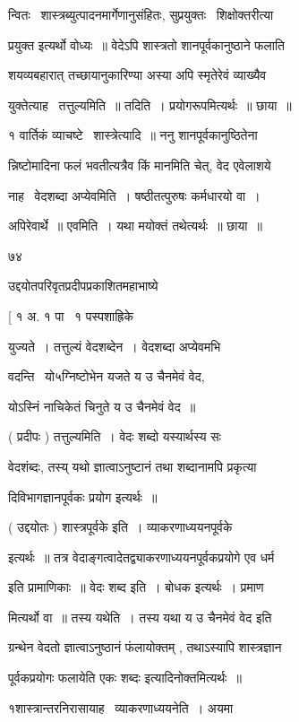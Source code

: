\documentclass[11pt, openany]{book}
\begin{document}
न्वितः \textendash\ शास्त्रब्युत्पादनमार्गेणानुसंहितः, सुप्रयुक्तः \textendash\ शिक्षोक्तरीत्या 

प्रयुक्त इत्यर्थो वोध्यः~॥ वेदेऽपि शास्त्रतो शानपूर्वकानुष्ठाने फलाति \textendash\ 


शयव्यबहारात् तच्छायानुकारिण्या अस्या अपि स्मृतेरेवं व्याख्यैव 

युक्तेत्याह \textendash\ तत्तुल्यमिति~॥ तदिति~। प्रयोगरूपमित्यर्थः~॥ छाया~॥ 

१ वार्तिकं व्याचष्टे \textendash\ शास्त्रेत्यादि~॥ ननु शानपूर्वकानुष्ठितेना \textendash\ 

न्निष्टोमादिना फलं भवतीत्यत्रैव किं मानमिति चेत्, वेद एवेलाशये \textendash\ 

नाह \textendash\ वेदशब्दा अप्येवमिति~। षष्ठीतत्पुरुषः कर्मधारयो वा~। 

अपिरेवार्थे~॥ एवमिति~। यथा मयोक्तं तथेत्यर्थः~॥ छाया~॥ 

७४ 

उद्दयोतपरिवृतप्रदीपप्रकाशितमहाभाष्ये \textendash\ 

[ १ अ. १ पा \textendash\ १ पस्पशाह्रिके 



युज्यते~। {\qt  तत्तुल्यं वेदशब्देन}~। वेदशब्दा अप्येवमभि \textendash\ 

वदन्ति \textendash\ {\qt यो५ग्निष्टोभेन यजते य उ चैनमेवं वेद},

योऽस्निं नाचिकेतं चिनुते य उ चैनमेवं वेद~॥ 

( प्रदीपः ) तत्तुल्यमिति~। वेदः शब्दो यस्यार्थस्य सः \textendash\ 

वेदशंब्दः, तस्य् यथो ज्ञात्वाऽनुष्टानं तथा शब्दानामपि प्रकृत्या \textendash\ 

दिविभागज्ञानपूर्वकः प्रयोग इत्यर्थः~॥ 

( उद्दयोतः ) शास्त्रपूर्वके इति~। व्याकरणाध्ययनपूर्वके 

इत्यर्थः~॥ तत्र वेदाङ्गत्वादेतद्व्याकरणाध्ययनपूर्वकप्रयोगे एव धर्म 

इति प्रामाणिकाः~॥ वेदः शब्द इति~। बोधक इत्यर्थः~। प्रमाण \textendash\ 

मित्यर्थो वा~॥ तस्य यथेति~। तस्य यथा {\qt य उ चैनमेवं वेद} इति 

ग्रन्थेन वेदतो ज्ञात्वाऽनुष्ठानं फंलायोक्तम् , तथाऽस्यापि शास्त्रज्ञान \textendash\ 


{\qt पूर्वकप्रयोगः फलायेति एकः शब्दः} इत्यादिनोक्तमित्यर्थः~॥ 



१शास्त्रान्तरनिरासायाह \textendash\ व्याकरणाध्ययनेति~। अयमा \textendash\ 
\end{document}
